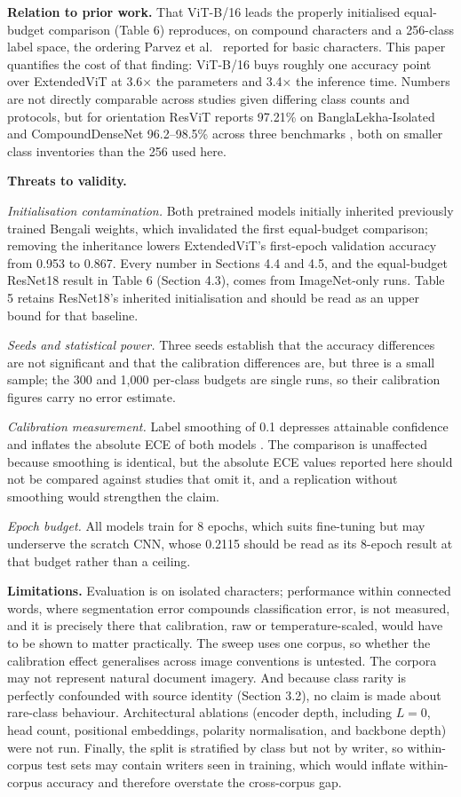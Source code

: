 \textbf{Relation to prior work.} That ViT-B/16 leads the properly
initialised equal-budget comparison (Table 6) reproduces, on compound
characters and a 256-class label space, the ordering Parvez et
al.~\citeyearpar{ref17} reported for basic characters. This paper quantifies the cost of
that finding: ViT-B/16
buys roughly one accuracy point over ExtendedViT at 3.6× the parameters
and 3.4× the inference time. Numbers are not directly comparable across
studies given differing class counts and protocols, but for orientation
ResViT reports 97.21\% on BanglaLekha-Isolated \citep{ref19} and
CompoundDenseNet 96.2--98.5\% across three benchmarks \citep{ref23}, both on
smaller class inventories than the 256 used here.

\textbf{Threats to validity.}

\emph{Initialisation contamination.} Both pretrained models initially inherited previously trained Bengali weights, which invalidated the first equal-budget comparison; removing the inheritance lowers ExtendedViT's first-epoch validation accuracy from 0.953 to 0.867. Every number in Sections 4.4 and 4.5, and the equal-budget ResNet18 result in Table 6 (Section 4.3), comes from ImageNet-only runs. Table 5 retains ResNet18's inherited initialisation and should be read as an upper bound for that baseline.

\emph{Seeds and statistical power.} Three seeds establish that the
accuracy differences are not significant and that the calibration
differences are, but three is a small sample; the 300 and 1,000
per-class budgets are single runs, so their calibration figures carry no
error estimate.

\emph{Calibration measurement.} Label smoothing of 0.1 depresses
attainable confidence and inflates the absolute ECE of both models
\citep{ref56}. The
comparison is unaffected because smoothing is identical, but the
absolute ECE values reported here should not be compared against studies that omit it,
and a replication without smoothing would strengthen the claim.

\emph{Epoch budget.} All models train for 8 epochs, which suits
fine-tuning but may underserve the scratch CNN, whose 0.2115 should be
read as its 8-epoch result at that budget rather than a ceiling.

\textbf{Limitations.} Evaluation is on isolated characters; performance
within connected words, where segmentation error compounds
classification error, is not measured, and it is precisely there that calibration, raw or temperature-scaled, would have to be shown to matter practically. The sweep uses one corpus, so whether the calibration
effect generalises across image conventions is untested. The corpora may
not represent natural document imagery. And because class rarity is
perfectly confounded with source identity (Section 3.2), no
claim is made about rare-class behaviour. Architectural ablations (encoder depth, including
$L = 0$, head count, positional embeddings, polarity normalisation, and
backbone depth) were not run. Finally, the split is stratified by class but not by writer, so within-corpus test sets may contain writers seen in training, which would inflate within-corpus accuracy and therefore overstate the cross-corpus gap.


